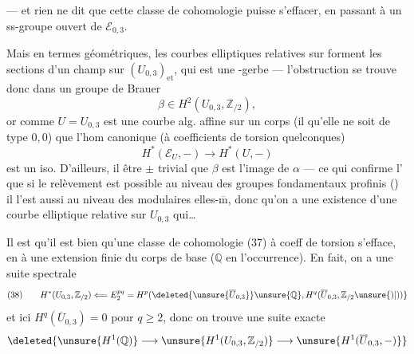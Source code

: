 --- et rien ne dit que cette classe de cohomologie puisse s'effacer, en passant à un ss-groupe ouvert de $\mathcal E_{0,3}$.


Mais en termes géométriques,  les courbes elliptiques relatives  sur  forment les sections d'un champ sur $(U_{0,3})_{\mathrm{et}}$, qui est une -gerbe --- l'obstruction se trouve donc dans un groupe de Brauer
\[
\beta\in H^2(U_{0,3},\mathbb Z_{/2}), \tag{37}
\]
or comme $U=U_{0,3}$ est une courbe alg.  affine sur un corps (il  qu'elle ne soit de type $0,0$)  que l'hom canonique (à coefficients de torsion quelconques)
\[
H^*(\mathcal E_U,-)\longrightarrow H^*(U,-)
\]
est un iso. D'ailleurs, il  être $\pm$ trivial que $\beta$ est l'image de $\alpha$ --- ce qui confirme l' que  si le relèvement est possible au niveau des groupes fondamentaux profinis () il l'est aussi au niveau des  modulaires elles-$\overline{\mathrm m}$, donc qu'on a une existence d'une courbe elliptique relative sur $U_{0,3}$ qui\ldots


Il est  qu'il est bien  qu'une classe de cohomologie (37) à coeff de torsion s'efface, en  à une extension finie du  corps de base ($\mathbb Q$ en l'occurrence). En fait, on a une suite spectrale
\[
(38)\qquad H^*(U_{0,3},\mathbb Z_{/2})
\Longleftarrow E_2^{pq}
=H^p(\deleted{\unsure{\overline U_{0,3}}}\unsure{\mathbb Q},H^q(\overline U_{0,3},\mathbb Z_{/2}\unsure{)|))}
\]
et ici $H^q(\overline U_{0,3})=0$ pour $q\geq 2$, donc on trouve une suite exacte
\[
\deleted{\unsure{H^1(\mathbb Q)}\longrightarrow
\unsure{H^1(U_{0,3},\mathbb Z_{/2})}\longrightarrow
\unsure{H^1(\overline U_{0,3},-)}}
\]


